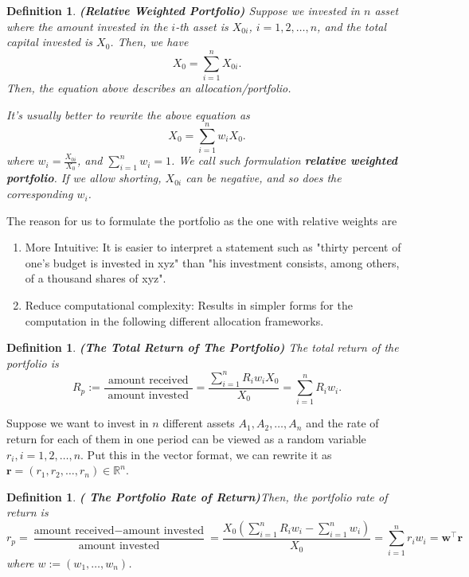 \documentclass[13pt]{article}
\newtheorem{definition}[theorem]{Definition}
\theoremstyle{definition}
\theoremstyle{remark}
\newenvironment{remark}
  {\pushQED{\qed}\renewcommand{\qedsymbol}{$\triangle$}\remarkx}
  {\popQED\endremarkx}
\begin{document}
\begin{definition}
    \textbf{(Relative Weighted Portfolio)} Suppose we invested in $n$ asset where the amount invested in the $i$-th asset is $X_{0i}$, $i=1,2,\ldots, n$, and the total capital invested is $X_0$. Then, we have
    \[
    X_0=\sum_{i=1}^n X_{0i}.
    \]
    Then, the equation above describes an allocation/portfolio.
    
    It's usually better to rewrite the above equation as
    \[
    X_0=\sum_{i=1}^n w_iX_{0}.
    \]
    where $w_i =\frac{X_{0i}}{X_{0}}$, and $\sum_{i=1}^n w_i = 1$.
    We call such formulation \textbf{relative weighted portfolio}. If we allow shorting, $X_{0i}$ can be negative, and so does the corresponding $w_i$.
\end{definition}
\begin{remark}
    The reason for us to formulate the portfolio as the one with relative weights are 
    \begin{enumerate}
        \item More Intuitive: It is easier to interpret a statement such as "thirty percent of one’s budget is invested in xyz" than "his investment consists, among others, of a thousand shares of xyz".
        \item Reduce computational complexity: Results in simpler forms for the computation in the following different allocation
        frameworks.
    \end{enumerate} 
\end{remark}

\begin{definition} \textbf{(The Total Return of The Portfolio)}
    The total return of the portfolio is
$$
R_{p}:=\frac{\text { amount received }}{\text { amount invested }}=\frac{\sum_{i=1}^{n} R_{i} w_{i} X_{0}}{X_{0}}=\sum_{i=1}^{n} R_{i} w_{i} .
$$
\end{definition}

Suppose we want to invest in $n$ different assets $A_1, A_2,\ldots, A_n$ and the rate of return for each of them in one period can be viewed as a random variable $r_i, i=1,2,\ldots, n$. Put this in the vector format, we can rewrite it as $\bm{r}=(r_1, r_2, \ldots, r_n)\in \mathbb{R}^n$.
\begin{definition}\textbf{( The Portfolio Rate of Return)}\label{def:portfolio rate of return}
    Then, the portfolio rate of return is
$$
r_p = \frac{\text{amount received}-\text{amount invested}}{\text{amount invested}} =\frac{X_{0}\left(\sum_{i=1}^{n} R_{i} w_{i}-\sum_{i=1}^{n} w_{i}\right)}{X_{0}} =\sum_{i=1}^{n} r_{i} w_{i} = \bm{w}^{\top} \bm{r}
$$
where $w:=\left(w_{1}, \ldots, w_{n}\right)$.
\end{definition}
\end{document}

